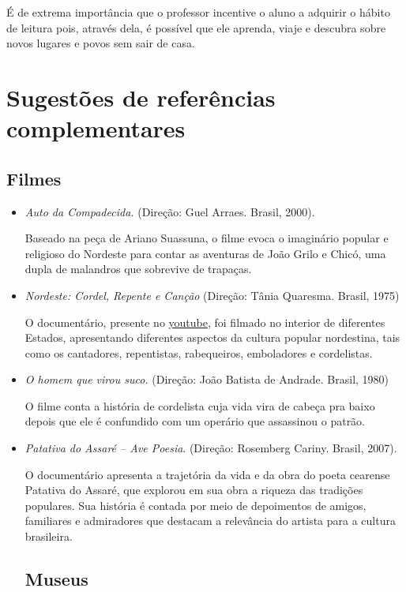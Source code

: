 \documentclass[12pt]{extarticle}
\begin{document}
É de extrema importância que o professor incentive o aluno a adquirir o
hábito de leitura pois, através dela, é possível que ele aprenda, viaje
e descubra sobre novos lugares e povos sem sair de casa.

\section{Sugestões de referências complementares}\label{sugestoes}


\subsection{Filmes}

\begin{itemize}

\item \textit{Auto da Compadecida.} (Direção: Guel Arraes. Brasil, 2000).

Baseado na peça de Ariano Suassuna, o filme evoca o imaginário popular e
religioso do Nordeste para contar as aventuras de João Grilo e Chicó,
uma dupla de malandros que sobrevive de trapaças.

\item \textit{Nordeste: Cordel, Repente e Canção} (Direção: Tânia Quaresma. Brasil, 1975)

O documentário, presente no \href{https://www.youtube.com/watch?v=xFOZxwBcUmo}{youtube}, 
foi filmado no interior de diferentes Estados, apresentando diferentes aspectos da
cultura popular nordestina, tais como os cantadores, repentistas, rabequeiros, emboladores e cordelistas.

\item \textit{O homem que virou suco.} (Direção: João Batista de Andrade. Brasil, 1980)

O filme conta a história de cordelista cuja vida vira de cabeça pra baixo depois que ele é confundido com um operário que assassinou o patrão.

\item \textit{Patativa do Assaré -- Ave Poesia}. (Direção: Rosemberg Cariny. Brasil, 2007).

O documentário apresenta a trajetória da vida e da obra do poeta
cearense Patativa do Assaré, que explorou em sua obra a riqueza das
tradições populares. Sua história é contada por meio de depoimentos de
amigos, familiares e admiradores que destacam a relevância do artista
para a cultura brasileira.

\subsection{Museus}


\end{itemize}
\end{document}
